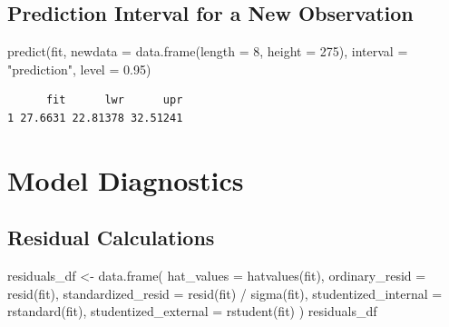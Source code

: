 \documentclass[
  letterpaper,
]{scrbook}
\newenvironment{Shaded}{\begin{snugshade}}{\end{snugshade}}
\newcommand{\AttributeTok}[1]{\textcolor[rgb]{0.40,0.45,0.13}{#1}}
\newcommand{\DecValTok}[1]{\textcolor[rgb]{0.68,0.00,0.00}{#1}}
\newcommand{\FloatTok}[1]{\textcolor[rgb]{0.68,0.00,0.00}{#1}}
\newcommand{\FunctionTok}[1]{\textcolor[rgb]{0.28,0.35,0.67}{#1}}
\newcommand{\NormalTok}[1]{\textcolor[rgb]{0.00,0.23,0.31}{#1}}
\newcommand{\OtherTok}[1]{\textcolor[rgb]{0.00,0.23,0.31}{#1}}
\newcommand{\SpecialCharTok}[1]{\textcolor[rgb]{0.37,0.37,0.37}{#1}}
\newcommand{\StringTok}[1]{\textcolor[rgb]{0.13,0.47,0.30}{#1}}
\begin{document}
\subsection{Prediction Interval for a New
Observation}\label{prediction-interval-for-a-new-observation}

\begin{Shaded}
\begin{Highlighting}[]
\FunctionTok{predict}\NormalTok{(fit, }\AttributeTok{newdata =} \FunctionTok{data.frame}\NormalTok{(}\AttributeTok{length =} \DecValTok{8}\NormalTok{, }\AttributeTok{height =} \DecValTok{275}\NormalTok{),}
        \AttributeTok{interval =} \StringTok{"prediction"}\NormalTok{, }\AttributeTok{level =} \FloatTok{0.95}\NormalTok{)}
\end{Highlighting}
\end{Shaded}

\begin{verbatim}
      fit      lwr      upr
1 27.6631 22.81378 32.51241
\end{verbatim}

\section{Model Diagnostics}\label{model-diagnostics}

\subsection{Residual Calculations}\label{residual-calculations}

\begin{Shaded}
\begin{Highlighting}[]
\NormalTok{residuals\_df }\OtherTok{\textless{}{-}} \FunctionTok{data.frame}\NormalTok{(}
  \AttributeTok{hat\_values =} \FunctionTok{hatvalues}\NormalTok{(fit),}
  \AttributeTok{ordinary\_resid =} \FunctionTok{resid}\NormalTok{(fit),}
  \AttributeTok{standardized\_resid =} \FunctionTok{resid}\NormalTok{(fit) }\SpecialCharTok{/} \FunctionTok{sigma}\NormalTok{(fit),}
  \AttributeTok{studentized\_internal =} \FunctionTok{rstandard}\NormalTok{(fit),}
  \AttributeTok{studentized\_external =} \FunctionTok{rstudent}\NormalTok{(fit)}
\NormalTok{)}
\NormalTok{residuals\_df}
\end{Highlighting}
\end{Shaded}
\end{document}
